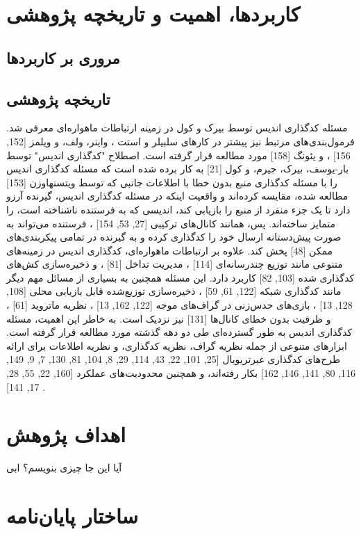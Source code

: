 	
\section{
	کاربردها، اهمیت و تاریخچه پژوهشی
	}
\subsection{
	مروری بر کاربردها
}

\subsection{
تاریخچه پژوهشی
}
مسئله کدگذاری اندیس توسط بیرک و کول 
\cite{paper:ISCOD:Birk, paper:1638566:brik}
 در زمینه ارتباطات ماهواره‌ای معرفی شد. فرمول‌بندی‌های مرتبط نیز پیشتر در کارهای سلبیلر و استت
  \cite{paper:1455117:Celebiler}،
   واینر، ولف، و ویلمز 
[152, 156]
، و یئونگ 
[158]
 مورد مطالعه قرار گرفته است. اصطلاح "کدگذاری اندیس" توسط بار-یوسف، بیرک، جیرم، و کول 
[21]
 به کار برده شده است که مسئله کدگذاری اندیس را با مسئله کدگذاری منبع بدون خطا با اطلاعات جانبی که توسط ویتسنهاوزن 
[153]
 مطالعه شده، مقایسه کرده‌اند و واقعیت اینکه در مسئله کدگذاری اندیس، گیرنده آرزو دارد تا یک جزء منفرد از منبع را بازیابی کند، اندیسی که به فرستنده ناشناخته است، را متمایز ساخته‌اند. پس، همانند کانال‌های ترکیبی 
[27, 53, 154]
، فرستنده می‌تواند به صورت پیش‌دستانه ارسال خود را کدگذاری کرده و به گیرنده در تمامی پیکربندی‌های ممکن 
[48]
 پخش کند. علاوه بر ارتباطات ماهواره‌ای، کدگذاری اندیس در زمینه‌های متنوعی مانند توزیع چندرسانه‌ای 
[114]
، مدیریت تداخل 
[81]
، و ذخیره‌سازی کش‌های کدگذاری شده 
[103, 82]
 کاربرد دارد. این مسئله همچنین به بسیاری از مسائل مهم دیگر مانند کدگذاری شبکه 
[122, 61, 59]
، ذخیره‌سازی توزیع‌شده قابل بازیابی محلی 
[108, 128, 13]
، بازی‌های حدس‌زنی در گراف‌های موجه 
[122, 162, 13]
، نظریه ماتروید 
[61]
، و ظرفیت بدون خطای کانال‌ها 
[131]
 نیز نزدیک است.
به خاطر این اهمیت، مسئله کدگذاری اندیس به طور گسترده‌ای طی دو دهه گذشته مورد مطالعه قرار گرفته است. ابزارهای متنوعی از جمله نظریه گراف، نظریه کدگذاری، و نظریه اطلاعات برای ارائه طرح‌های کدگذاری غیرتریویال 
[25, 101, 22, 43, 114, 29, 8, 104, 81, 130, 7, 9, 149, 116, 80, 141, 146, 162]
 بکار رفته‌اند، و همچنین محدودیت‌های عملکرد 
[160, 22, 55, 28, 17, 141]
.

\section{اهداف پژوهش}
آیا این جا چیزی بنویسم؟ ابی

\section{ساختار پایان‌نامه}

